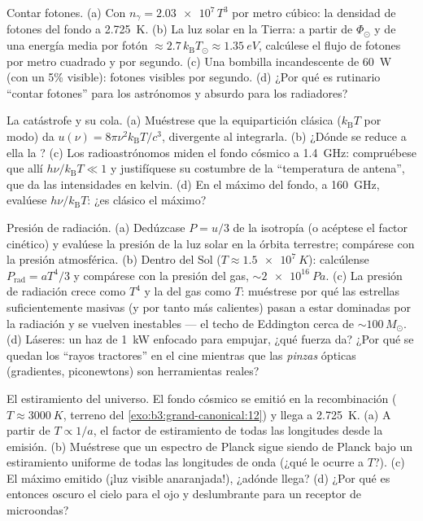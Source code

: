 \begin{exercise}[$\star$]\label{exo:b3:photons-phonons:3}
Contar fotones. (a) Con $n_\gamma = \num{2.03e7}\,T^3$ por
metro cúbico: la densidad de fotones del fondo a \qty{2.725}{K}.
(b) La luz solar en la Tierra: a partir de $\Phi_\odot$ y de una energía media por fotón
$\approx 2.7\,k_{\text{B}}T_\odot \approx \qty{1.35}{eV}$,
calcúlese el flujo de fotones por metro cuadrado y por segundo. (c) Una
bombilla incandescente de \qty{60}{W} (con un 5\% visible): fotones visibles por
segundo. (d) ¿Por qué es rutinario ``contar fotones'' para los astrónomos
y absurdo para los radiadores?
\end{exercise}

\begin{exercise}[$\star$]\label{exo:b3:photons-phonons:4}
La catástrofe y su cola. (a) Muéstrese que la equipartición clásica
($k_{\text{B}}T$ por modo) da $u(\nu) =
8\pi\nu^2k_{\text{B}}T/c^3$, divergente al integrarla. (b) ¿Dónde
se reduce a ella la ? (c) Los radioastrónomos miden
el fondo cósmico a \qty{1.4}{GHz}: compruébese que allí $h\nu/k_{\text{B}}T \ll 1$ y
justifíquese su costumbre de la ``temperatura de antena'', que da las intensidades
en kelvin. (d) En el máximo del fondo, a \qty{160}{GHz}, evalúese
$h\nu/k_{\text{B}}T$: ¿es clásico el máximo?
\end{exercise}

\begin{exercise}[$\star\star$]\label{exo:b3:photons-phonons:5}
Presión de radiación. (a) Dedúzcase $P = u/3$ de la isotropía (o acéptese
el factor cinético) y evalúese la presión de la luz solar en la
órbita terrestre; compárese con la presión atmosférica. (b) Dentro del
Sol ($T \approx \qty{1.5e7}{K}$): calcúlense $P_{\text{rad}} =
aT^4/3$ y compárese con la presión del gas, $\sim\qty{2e16}{Pa}$.
(c) La presión de radiación crece como $T^4$ y la del gas como $T$: muéstrese
por qué las estrellas suficientemente masivas (y por tanto más calientes) pasan
a estar dominadas por la radiación y se vuelven inestables --- el techo de
Eddington cerca de $\sim100\,M_\odot$. (d) Láseres: un haz de \qty{1}{kW} enfocado
para empujar, ¿qué fuerza da? ¿Por qué se quedan los ``rayos tractores'' en el cine mientras
que las \emph{pinzas} ópticas (gradientes, piconewtons) son herramientas reales?
\end{exercise}

\begin{exercise}[$\star\star$]\label{exo:b3:photons-phonons:6}
El estiramiento del universo. El fondo cósmico se emitió en la recombinación
($T \approx \qty{3000}{K}$, terreno del
\cref{exo:b3:grand-canonical:12}) y llega a \qty{2.725}{K}. (a) A partir de $T \propto
1/a$, el factor de estiramiento de todas las longitudes desde la emisión. (b) Muéstrese
que un espectro de Planck sigue siendo de Planck bajo un estiramiento uniforme de todas
las longitudes de onda (¿qué le ocurre a $T$?). (c) El máximo emitido (¡luz visible
anaranjada!), ¿adónde llega? (d) ¿Por qué es entonces oscuro el cielo
para el ojo y deslumbrante para un receptor de microondas?
\end{exercise}

